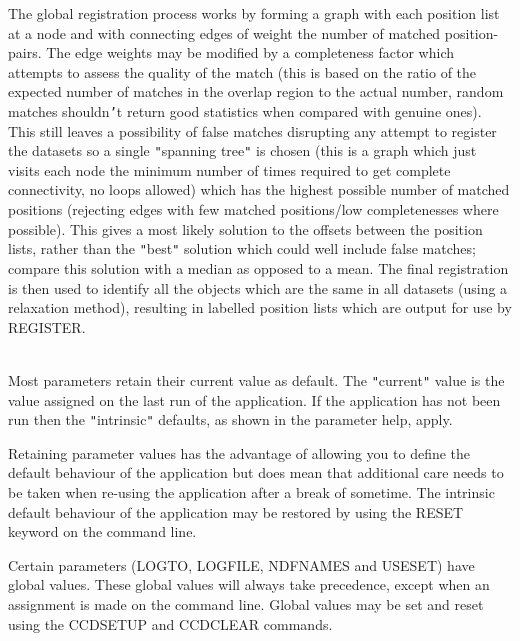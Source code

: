 \documentclass[twoside,11pt]{article}
\newcommand{\htmlref}[2]{#1}
\renewcommand{\_}{\texttt{\symbol{95}}}
\newcommand{\qt}[1]{{\tt "}#1{\tt "}}
\newcommand{\xroutine}[1]{\htmlref{{\sc #1}}{#1}}
\newcommand{\sstdiytopic}[2]{\item[#1:] \mbox{} \\[1.3ex] #2}
\newcommand{\sstdiytopic}[2]{\item[{#1}] #2 }
\begin{document}
{{      The global registration process works by forming a graph with
      each position list at a node and with connecting edges of weight
      the number of matched position-pairs. The edge weights may be
      modified by a completeness factor which attempts to assess the
      quality of the match (this is based on the ratio of the expected
      number of matches in the overlap region to the actual number,
      random matches shouldn{\tt '}t return good statistics when compared
      with genuine ones). This still leaves a possibility of false
      matches disrupting any attempt to register the datasets so a
      single {\tt "}spanning tree{\tt "} is chosen (this is a graph which just
      visits each node the minimum number of times required to get
      complete connectivity, no loops allowed) which has the highest
      possible number of matched positions (rejecting edges with few
      matched positions/low completenesses where possible). This gives
      a most likely solution to the offsets between the position lists,
      rather than the {\tt "}best{\tt "} solution which could well include false
      matches; compare this solution with a median as opposed to a
      mean. The final registration is then used to identify all the
      objects which are the same in all datasets (using a relaxation
      method), resulting in labelled position lists which are output
      for use by \xroutine{REGISTER}.
   }
   \sstdiytopic{
      Behaviour of parameters
   } {
      Most parameters retain their current value as default. The
      \qt{current} value is the value assigned on the last run of the
      application. If the application has not been run then the
      \qt{intrinsic} defaults, as shown in the parameter help, apply.

      Retaining parameter values has the advantage of allowing you to
      define the default behaviour of the application but does mean
      that additional care needs to be taken when re-using the
      application after a break of sometime. The intrinsic default
      behaviour of the application may be restored by using the RESET
      keyword on the command line.

      Certain parameters (LOGTO, LOGFILE, NDFNAMES and USESET) have global
      values. These global values will always take precedence, except
      when an assignment is made on the command line.  Global values may
      be set and reset using the \xroutine{CCDSETUP} and \xroutine{CCDCLEAR} commands.
   }
}
\end{document}
